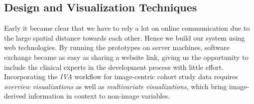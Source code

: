 \documentclass[journal]{style/vgtc} 			          %
\begin{document}
\subsection{Design and Visualization Techniques} \label{Structure and Workflow}
Early it became clear that we have to rely a lot on online communication due to the large spatial distance towards each other.
%
Hence we build our system using web technologies.%
%
By running the prototypes on server machines, software exchange became as easy as sharing a website link, giving us the opportunity to include the clinical experts in the development process with little effort.
%
Incorporating the \emph{IVA} workflow for image-centric cohort study data requires \emph{overview visualizations} as well as \emph{multivariate visualizations}, which bring image-derived information in context to non-image variables.
\end{document}
